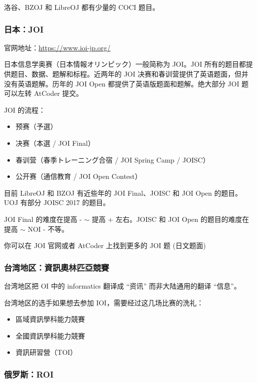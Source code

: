 洛谷、BZOJ 和 LibreOJ 都有少量的 COCI 题目。

\subsubsection{日本：JOI}

官网地址：\url{https://www.ioi-jp.org/}  

日本信息学奥赛（日本情報オリンピック）一般简称为 JOI。JOI 所有的题目都提供题目、数据、题解和标程。近两年的 JOI 决赛和春训营提供了英语题面，但并没有英语题解。历年的 JOI Open 都提供了英语版题面和题解。绝大部分 JOI 题可以左转 AtCoder 提交。

JOI 的流程：

\begin{itemize}
\item 预赛（予選）
\item 决赛（本選 / JOI Final）
\item 春训营（春季トレーニング合宿 / JOI Spring Camp / JOISC）
\item 公开赛（通信教育 / JOI Open Contest）
\end{itemize}

目前 LibreOJ 和 BZOJ 有近些年的 JOI Final、JOISC 和 JOI Open 的题目。UOJ 有部分 JOISC 2017 的题目。

JOI Final 的难度在提高 - $\sim$ 提高 + 左右。JOISC 和 JOI Open 的题目的难度在提高 $\sim$ NOI - 不等。

你可以在 JOI 官网或者 AtCoder 上找到更多的 JOI 题 (日文题面)

\subsubsection{台湾地区：資訊奧林匹亞競賽}

台湾地区把 OI 中的 informatics 翻译成 “资讯” 而非大陆通用的翻译 “信息”。  

台湾地区的选手如果想去参加 IOI，需要经过这几场比赛的洗礼：  

\begin{itemize}
\item 區域資訊學科能力競賽
\item 全國資訊學科能力競賽
\item 資訊研習營（TOI）
\end{itemize}

\subsubsection{俄罗斯：ROI}

